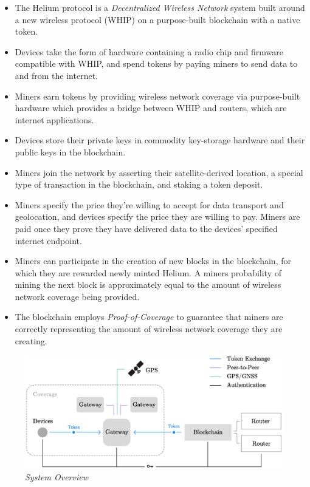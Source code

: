 \documentclass[letterpaper,11pt]{article}
\begin{document}
\begin{itemize}
    \item The Helium protocol is a \emph{Decentralized Wireless Network} system built around a new wireless protocol (WHIP) on a purpose-built blockchain with a native token.
    \item Devices take the form of hardware containing a radio chip and firmware compatible with WHIP, and spend tokens by paying miners to send data to and from the internet.
    \item Miners earn tokens by providing wireless network coverage via purpose-built hardware which provides a bridge between WHIP and routers, which are internet applications.
    \item Devices store their private keys in commodity key-storage hardware and their public keys in the blockchain.
    \item Miners join the network by asserting their satellite-derived location, a special type of transaction in the blockchain, and staking a token deposit.
    \item Miners specify the price they're willing to accept for data transport and geolocation, and devices specify the price they are willing to pay. Miners are paid once they prove they have delivered data to the devices' specified internet endpoint.
    \item Miners can participate in the creation of new blocks in the blockchain, for which they are rewarded newly minted Helium. A miners probability of mining the next block is approximately equal to the amount of wireless network coverage being provided.
    \item The blockchain employs \emph{Proof-of-Coverage} to guarantee that miners are correctly representing the amount of wireless network coverage they are creating.
\end{itemize}

\begin{figure}[H]
    \begin{center}
          \includegraphics[width=\textwidth]{diagram1.eps}
          \caption{\emph{System Overview}}
          \label{fig:system}
     \end{center}
\end{figure}
\end{document}
